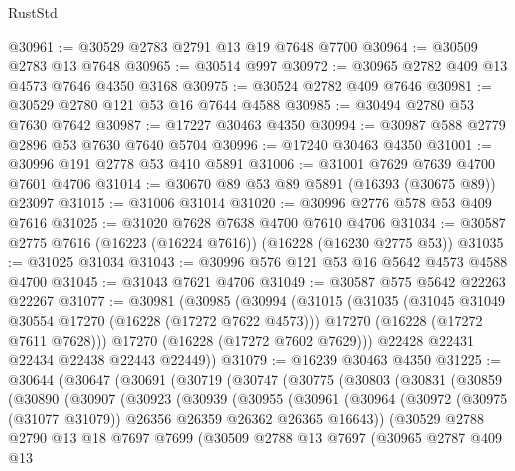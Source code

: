 \begin{lexlean}{RustStd}
\begin{coremodule}
@30961 := @30529 @2783 @2791 @13 @19 @7648 @7700
@30964 := @30509 @2783 @13 @7648
@30965 := @30514 @997
@30972 := @30965 @2782 @409 @13 @4573 @7646 @4350 @3168
@30975 := @30524 @2782 @409 @7646
@30981 := @30529 @2780 @121 @53 @16 @7644 @4588
@30985 := @30494 @2780 @53 @7630 @7642
@30987 := @17227 @30463 @4350
@30994 := @30987 @588 @2779 @2896 @53 @7630 @7640 @5704
@30996 := @17240 @30463 @4350
@31001 := @30996 @191 @2778 @53 @410 @5891
@31006 := @31001 @7629 @7639 @4700 @7601 @4706
@31014 := @30670 @89 @53 @89 @5891 (@16393 (@30675 @89)) @23097
@31015 := @31006 @31014
@31020 := @30996 @2776 @578 @53 @409 @7616
@31025 := @31020 @7628 @7638 @4700 @7610 @4706
@31034 := @30587 @2775 @7616 (@16223 (@16224 @7616)) (@16228 (@16230 @2775 @53))
@31035 := @31025 @31034
@31043 := @30996 @576 @121 @53 @16 @5642 @4573 @4588 @4700
@31045 := @31043 @7621 @4706
@31049 := @30587 @575 @5642 @22263 @22267
@31077 := @30981
    (@30985
      (@30994
        (@31015
          (@31035
            (@31045 @31049 @30554 @17270 (@16228 (@17272 @7622 @4573)))
            @17270
            (@16228 (@17272 @7611 @7628)))
          @17270
          (@16228 (@17272 @7602 @7629)))
        @22428
        @22431
        @22434
        @22438
        @22443
        @22449))
@31079 := @16239 @30463 @4350
@31225 := @30644
    (@30647
      (@30691
        (@30719
          (@30747
            (@30775
              (@30803
                (@30831
                  (@30859
                    (@30890
                      (@30907
                        (@30923
                          (@30939
                            (@30955
                              (@30961
                                (@30964
                                  (@30972
                                    (@30975 (@31077 @31079))
                                    @26356
                                    @26359
                                    @26362
                                    @26365
                                    @16643))
                                (@30529
                                  @2788
                                  @2790
                                  @13
                                  @18
                                  @7697
                                  @7699
                                  (@30509
                                    @2788
                                    @13
                                    @7697
                                    (@30965
                                      @2787
                                      @409
                                      @13

\end{coremodule}
\end{lexlean}
